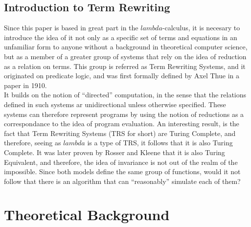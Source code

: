 \documentclass[12pt]{article}
\begin{document}
\subsection{Introduction to Term Rewriting}
Since this paper is based in great part in the $lambda$-calculus, it is necesary to introduce the idea of it not only as a specific set of terms and equations in an unfamiliar form to anyone without a background in theoretical computer science, but as a member of a greater group of systems that rely on the idea of reduction as a relation on terms. This group is referred as Term Rewriting Systems, and it originated on predicate logic, and was first formally defined by Axel Thue in a paper in 1910.\\
It builds on the notion of \enquote{directed} computation, in the sense that the relations defined in such systems ar unidirectional unless otherwise specified. These systems can therefore represent programs by using the notion of reductions as a correspondance to the idea of program evaluation. An interesting result, is the fact that Term Rewriting Systems (TRS for short) are Turing Complete, and therefore, seeing as $lambda$ is a type of TRS, it follows that it is also Turing Complete. It was later proven by Rosser and Kleene that it is also Turing Equivalent, and therefore, the idea of invariance is not out of the realm of the impossible. Since both models define the same group of functions, would it not follow that there is an algorithm that can \enquote{reasonably} simulate each of them? \\

\section{Theoretical Background}\label{theoretical-background}
\end{document}
